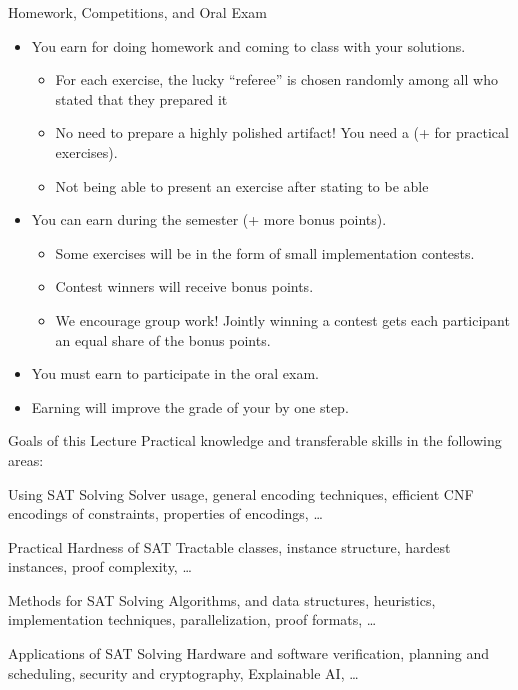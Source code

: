 \documentclass[t]{sdqbeamer}
\begin{document}
\begin{frame}{Homework, Competitions, and Oral Exam}
\begin{itemize}\setlength{\itemsep}{1em}
	\item You earn  for doing homework and coming to class with your solutions.
	\begin{itemize}
		\item For each exercise, the lucky ``referee'' is chosen randomly among all who stated that they prepared it
		\item No need to prepare a highly polished artifact! You need a  (+  for practical exercises).
		\item Not being able to present an exercise after stating to be able 
	\end{itemize}
	\item You can earn  during the semester (+ more bonus points).
	\begin{itemize}
		\item Some exercises will be in the form of small implementation contests.
		\item Contest winners will receive bonus points.
		\item We encourage group work! Jointly winning a contest gets each participant an equal share of the bonus points.
	\end{itemize}
	\item You must earn  to participate in the oral exam.
	\item Earning  will improve the grade of your  by one step.
\end{itemize}
\end{frame}

\begin{frame}{Goals of this Lecture}
Practical knowledge and transferable skills in the following areas:
\vspace*{5mm}
\begin{block}{Using SAT Solving}
	Solver usage, general encoding techniques, efficient CNF encodings of constraints, properties of encodings, \dots
\end{block}
\pause
\begin{block}{Practical Hardness of SAT}
Tractable classes, instance structure, hardest instances, proof complexity, \dots
\end{block}
\pause
\begin{block}{Methods for SAT Solving}
	Algorithms, and data structures, heuristics, implementation techniques, parallelization, proof formats, \dots
\end{block}
\pause
\begin{block}{Applications of SAT Solving}
	Hardware and software verification, planning and scheduling, security and cryptography, Explainable AI, \dots
\end{block}
\end{frame}
\end{document}
